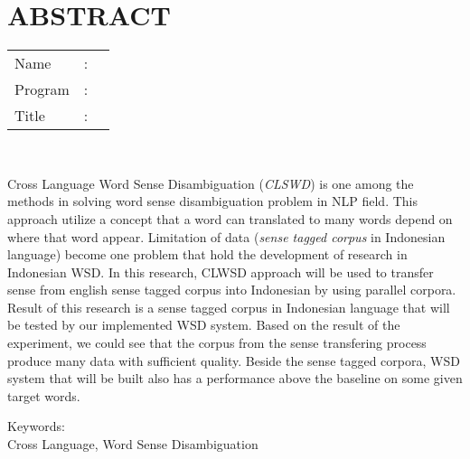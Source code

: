 %
%
%

\chapter*{ABSTRACT}

\vspace*{0.2cm}

\noindent \begin{tabular}{l l p{11.0cm}}
	Name&: & \penulis \\
	Program&: & \programEng \\
	Title&: & \judulInggris \\
\end{tabular} \\ 

\vspace*{0.5cm}

\noindent 
Cross Language Word Sense Disambiguation (\textit{CLSWD}) is one among the methods in solving word sense disambiguation problem in NLP field. This approach utilize a concept that a word can translated to many words depend on where that word appear. Limitation of data (\textit{sense tagged corpus} in Indonesian language) become one problem that hold the development of research in Indonesian WSD. In this research, CLWSD approach will be used to transfer sense from english sense tagged corpus into Indonesian by using parallel corpora. Result of this research is a sense tagged corpus in Indonesian language that will be tested by our implemented WSD system. Based on the result of the experiment, we could see that the corpus from the sense transfering process produce many data with sufficient quality. Beside the sense tagged corpora, WSD system that will be built also has a performance above the baseline on some given target words.
\vspace*{0.2cm}

\noindent Keywords: \\ 
\noindent Cross Language, Word Sense Disambiguation

\newpage